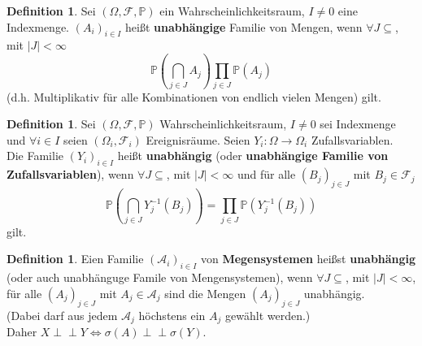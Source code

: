\documentclass[10pt,a4paper]{article}
\newcommand{\indep}{\perp\!\!\!\perp}
\newcommand{\Prb}{\mathbb P}
\newcommand{\scA}{\mathscr A}
\newcommand{\scF}{\ensuremath{\mathscr{F}}}
\theoremstyle{plain}
\theoremstyle{definition}
\newtheorem{definition}[theorem]{Definition}
\theoremstyle{remark}
\begin{document}
	\begin{definition}
		Sei $(\Omega,\scF,\Prb)$ ein Wahrscheinlichkeitsraum, $I\neq 0$ eine Indexmenge. $(A_i)_{i\in I}$ heißt \textbf{unabhängige} Familie von Mengen, wenn $\forall J\subseteq$, mit $|J|<\infty$
		\[\Prb\left(\bigcap_{j\in J}A_j\right)\prod_{j\in J}\Prb(A_j)\]
		(d.h. Multiplikativ für alle Kombinationen von endlich vielen Mengen) gilt.
	\end{definition}

	\begin{definition}\label{0313def}
		Sei $(\Omega,\scF,\Prb)$ Wahrscheinlichkeitsraum, $I\neq 0$ sei Indexmenge und $\forall i\in I$ seien $(\Omega_i,\scF_i)$ Ereignisräume. Seien $Y_i:\Omega\to\Omega_i$ Zufallsvariablen.\\
		Die Familie $(Y_i)_{i\in I}$ heißt \textbf{unabhängig} (oder \textbf{unabhängige Familie von Zufallsvariablen}), wenn  $\forall J\subseteq$, mit $|J|<\infty$ und für alle $(B_j)_{j\in J}$ mit $B_j\in\scF_j$
		\[\Prb\left(\bigcap_{j\in J}Y^{-1}_j(B_j)\right)=\prod_{j\in J}\Prb\left(Y^{-1}_j(B_j)\right)\]
		gilt.
	\end{definition}
	\addtocounter{theorem}{-1}
	\begin{definition} %
		Eien Familie $(\scA_i)_{i\in I}$ von \textbf{Megensystemen} heißst \textbf{unabhängig} (oder auch unabhänguge Famile von Mengensystemen), wenn  $\forall J\subseteq$, mit $|J|<\infty$, für alle $(A_j)_{j\in J}$ mit $A_j\in\scA_j$ sind die Mengen $(A_j)_{j\in J}$ unabhängig.\\
		(Dabei darf aus jedem $\scA_j$ höchstens ein $A_j$ gewählt werden.)\\
		Daher $X\indep Y\Leftrightarrow\sigma(A)\indep\sigma(Y)$.
	\end{definition}
	
\end{document}
